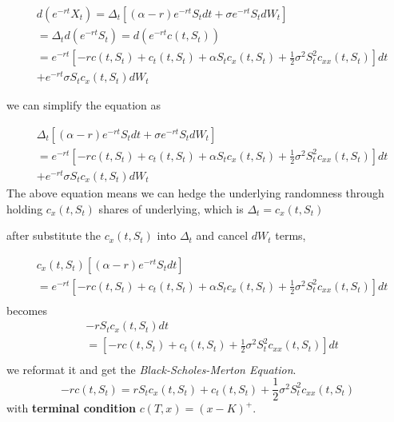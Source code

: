 \documentclass[a4]{article}
\begin{document}
 \par
\begin{equation}
\begin{aligned}
&d(e^{-rt}X_{t})=\Delta _{t}\left[(\alpha - r)e^{-rt}S_{t}dt+\sigma e^{-rt}S_{t}dW_{t}\right]\\
&=\Delta_{t}d(e^{-rt}S_{t})=d(e^{-rt}c(t,S_{t}))\\
&=e^{-rt}\left[-rc(t,S_{t}) + c_{t}(t,S_{t})+\alpha S_{t}c_{x}(t,S_{t})+\frac{1}{2}\sigma^{2}S^{2}_{t}c_{xx}(t,S_{t})\right]dt\\
& +e^{-rt}\sigma S_{t}c_{x}(t,S_{t})dW_{t}
\end{aligned}
\end{equation}\par 
we can simplify the equation as \par 
\begin{equation}
\begin{aligned}
&\Delta _{t}\left[(\alpha - r)e^{-rt}S_{t}dt+\sigma e^{-rt}S_{t}dW_{t}\right]\\
&=e^{-rt}\left[-rc(t,S_{t}) + c_{t}(t,S_{t})+\alpha S_{t}c_{x}(t,S_{t})+\frac{1}{2}\sigma^{2}S^{2}_{t}c_{xx}(t,S_{t})\right]dt\\
& +e^{-rt}\sigma S_{t}c_{x}(t,S_{t})dW_{t}
\end{aligned}
\end{equation}
The above equation means we can hedge the underlying randomness through holding $c_{x}(t,S_{t})$ shares of underlying, which is $\Delta_{t}=c_{x}(t,S_{t})$\\
\par 
after substitute the $c_{x}(t,S_{t})$ into $\Delta_{t}$ and cancel $dW_{t}$ terms,\par
\begin{equation}
\begin{aligned}
&c_{x}(t,S_{t})\left[(\alpha - r)e^{-rt}S_{t}dt\right]\\
&=e^{-rt}\left[-rc(t,S_{t}) + c_{t}(t,S_{t})+\alpha S_{t}c_{x}(t,S_{t})+\frac{1}{2}\sigma^{2}S^{2}_{t}c_{xx}(t,S_{t})\right]dt\\
\end{aligned}
\end{equation}
becomes
\begin{equation}
\begin{aligned}
&-rS_{t}c_{x}(t,S_{t})dt\\
&=\left[-rc(t,S_{t}) + c_{t}(t,S_{t})+\frac{1}{2}\sigma^{2}S^{2}_{t}c_{xx}(t,S_{t})\right]dt\\
\end{aligned}
\end{equation}
we reformat it and get the \textsl{Black-Scholes-Merton Equation}.
\begin{equation}
-rc(t,S_{t})=rS_{t}c_{x}(t,S_{t})+ c_{t}(t,S_{t})+\frac{1}{2}\sigma^{2}S^{2}_{t}c_{xx}(t,S_{t})
\end{equation}
with \textbf{terminal condition} $c(T,x)=(x-K)^{+}$.\par 
\end{document}
